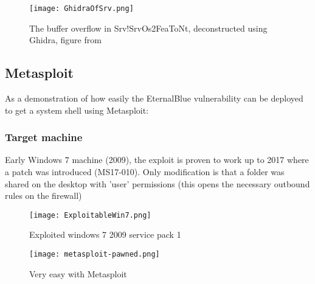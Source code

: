 \documentclass[
	letterpaper, %
	10pt, %
	unnumberedsections, %
	twoside, %
]{LTJournalArticle}
\begin{document}
\begin{figure}[ht] %
	\texttt{[image: GhidraOfSrv.png]}
	\caption{The buffer overflow in Srv!SrvOs2FeaToNt, deconstructed using Ghidra, figure from \cite{h3xduck}}
	\label{fig:Ghidra_srv.sys}
\end{figure}



\subsection{Metasploit}
As a demonstration of how easily the EternalBlue vulnerability can be deployed to get a system shell using Metasploit:

\subsubsection[short]{Target machine}
Early Windows 7 machine (2009), the exploit is proven to work up to 2017 where a patch was introduced (MS17-010).
Only modification is that a folder was shared on the desktop with 'user' permissions (this opens the necessary outbound rules on the firewall)

\begin{figure}[ht] %
	\texttt{[image: ExploitableWin7.png]}
	\caption{Exploited windows 7 2009 service pack 1}
	\label{fig:ExploitableWin7}
\end{figure}

\begin{figure}[ht] %
	\texttt{[image: metasploit-pawned.png]}
	\caption{Very easy with Metasploit}
	\label{fig:metasploit-pawned}
\end{figure}














\end{document}
